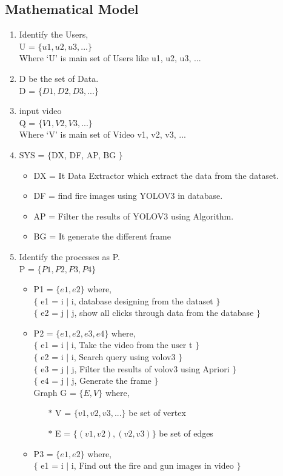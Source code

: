 \subsection{Mathematical Model}
\begin{enumerate}
	\item Identify the Users,\\
	U = $\{ u1, u2, u3, ... \}$\\
	Where `U' is main set of Users like u1, u2, u3, ...
	
	\item D be the set of Data.\\
	D = $\{ D1, D2, D3, ... \}$
	
	\item input video\\
	Q = $\{ V1, V2, V3, ... \}$\\
	Where `V' is main set of Video v1, v2, v3, ...
	
	\item SYS = $\{$DX, DF, AP, BG $\}$
	\begin{itemize}
		\item DX = It Data Extractor which extract the data from the dataset.
		\item DF = find fire images using YOLOV3 in database.
		\item AP = Filter the results of YOLOV3 using Algorithm.
		\item BG = It generate the different frame
		
	\end{itemize}
	\item Identify the processes as P.\\
	P = $\{ P1, P2, P3, P4 \}$
	\begin{itemize}
		\item P1 = $\{ e1, e2 \}$ where,\\
		$\{$ e1 = i $|$ i, database designing from the dataset  $\}$\\
		$\{$ e2 = j $|$ j, show all clicks through data from the database  $\}$
		\item P2 = $\{ e1, e2, e3, e4 \}$ where,\\
		$\{$ e1 = i $|$ i, Take the video from the user t $\}$\\
		$\{$ e2 = i $|$ i, Search query using volov3 $\}$\\
		$\{$ e3 = j $|$ j, Filter the results of volov3 using Apriori $\}$\\
		$\{$ e4 = j $|$ j, Generate the frame $\}$\\
		Graph G = $\{ E, V \}$ where,
		\begin{itemize}
			\item[$\ast$] V = $\{ v1, v2, v3, ... \}$ be set of vertex
			\item[$\ast$] E = $\{ (v1,v2), (v2,v3) \}$ be set of edges
		\end{itemize}
		\item P3 = $\{ e1, e2 \}$ where,\\
		$\{$ e1 = i $|$ i, Find out the fire and gun images in video $\}$\\
		

\end{itemize}
\end{enumerate}
